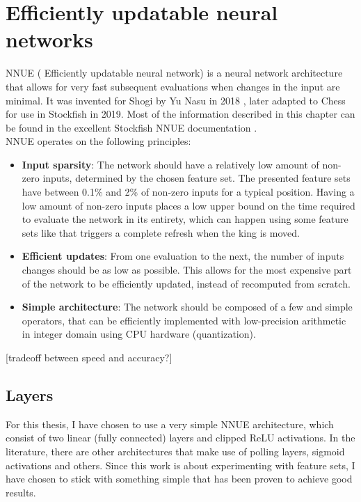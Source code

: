 \section{Efficiently updatable neural networks}

NNUE ( Efficiently updatable neural network) is a neural network architecture that allows for very fast subsequent evaluations when changes in the input are minimal. It was invented for Shogi by Yu Nasu in 2018 \cite{nnue:2018}, later adapted to Chess for use in Stockfish in 2019. Most of the information described in this chapter can be found in the excellent Stockfish NNUE documentation \cite{nnue-pytorch}. \\

NNUE operates on the following principles:

\begin{itemize}
    \item \textbf{Input sparsity}: The network should have a relatively low amount of non-zero inputs, determined by the chosen feature set. The presented feature sets have between 0.1\% and 2\% of non-zero inputs for a typical position. Having a low amount of non-zero inputs places a low upper bound on the time required to evaluate the network in its entirety, which can happen using some feature sets like  that triggers a complete refresh when the king is moved.
    \item \textbf{Efficient updates}: From one evaluation to the next, the number of inputs changes should be as low as possible. This allows for the most expensive part of the network to be efficiently updated, instead of recomputed from scratch.
    \item \textbf{Simple architecture}: The network should be composed of a few and simple operators, that can be efficiently implemented with low-precision arithmetic in integer domain using CPU hardware (quantization).

\end{itemize}

[tradeoff between speed and accuracy?]

\subsection{Layers}

For this thesis, I have chosen to use a very simple NNUE architecture, which consist of two linear (fully connected) layers and clipped ReLU activations. In the literature, there are other architectures that make use of polling layers, sigmoid activations and others. Since this work is about experimenting with feature sets, I have chosen to stick with something simple that has been proven to achieve good results.

